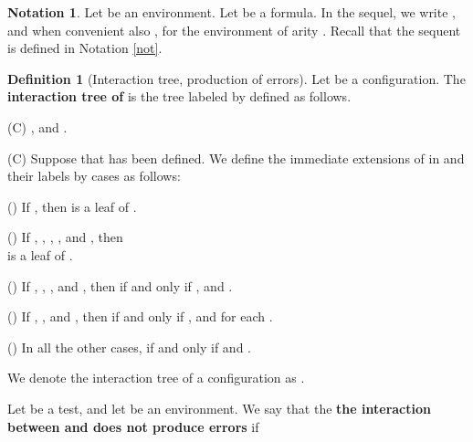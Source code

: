 \documentclass[copyright,creativecommons]{eptcs}
\theoremstyle{definition}
\newtheorem{Definition}[theorem]{Definition}
\newtheorem{Notation}[theorem]{Notation}
\newcommand{\squishlist}{
 \begin{list}{}
  { \setlength{\itemsep}{0pt}
     \setlength{\parsep}{3pt}
     \setlength{\topsep}{3pt}
     \setlength{\partopsep}{0pt}
     \setlength{\leftmargin}{1em}
     \setlength{\labelwidth}{1.5em}
     \setlength{\labelsep}{0.5em} } }
\newcommand{\squishend}{
  \end{list}  }
\begin{document}
\begin{Notation}
Let 
 be an environment.
Let     be a formula. In the sequel, we write
,   and when convenient also   ,
 for the environment
  of arity . Recall that the sequent  is defined in
Notation \ref{not}.
 \hfill 

\end{Notation}







 \begin{Definition}[Interaction tree, production of errors] \label{comptree}
 Let  be a configuration.
The  \textbf{interaction tree of }
is the tree  labeled by 
 defined as follows.

\squishlist
\item[ (C)]  ,  and .

\item[ (C)]  Suppose that  has been
 defined. We define the immediate  extensions of
  in   \linebreak      and their labels by cases as follows:


\squishlist

\item[ ()] \hspace{-0.11cm}If , then  is  a leaf of .

\item[ ()] \hspace{-0.07cm}If  ,
  ,  , ,  and , then  \\
 is a leaf of .


\item[ ()] If  ,
, ,  and , then \linebreak
  if and only if ,
and .

\item[ ()] If   ,
,   and , then   \linebreak
 if and only if ,
and   for each .
\item [ ()]  \hspace{-0.20cm} In all the other cases,  if and only if   and
 .
\squishend
\squishend
We denote the interaction tree of a configuration
 as .

Let  be a test,  and let  be an environment.
We say that the \textbf{the interaction between  and  does not produce errors}
if
\squishlist
\item[] 
\squishend
\end{Definition}
\end{document}
